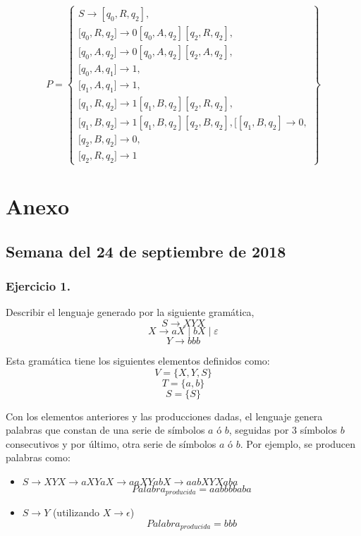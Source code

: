 \documentclass[11pt,a4paper]{article}
\begin{document}
	  \[P=\left\{\begin{array}{c} 
	  			 S\rightarrow [q_0,R,q_2],\\
	  			 \lbrack q_0,R,q_2]\rightarrow 0[q_0,A,q_2][q_2,R,q_2],\\
	  			 \lbrack q_0,A,q_2]\rightarrow 0[q_0,A,q_2][q_2,A,q_2],\\
	  			 \lbrack q_0,A,q_1]\rightarrow 1, \\
	  			 \lbrack q_1,A,q_1]\rightarrow 1,\\
	  			 \lbrack q_1,R,q_2]\rightarrow 1[q_1,B,q_2][q_2,R,q_2],\\
	  			 \lbrack q_1,B,q_2]\rightarrow 1[q_1,B,q_2][q_2,B,q_2],
	  			 \lbrack [q_1,B,q_2]\rightarrow 0, \\
	  			 \lbrack q_2,B,q_2]\rightarrow 0,\\
	  			 \lbrack q_2,R,q_2]\rightarrow 1
	\end{array}\right\}\]

\newpage

\section{Anexo}
\subsection{Semana del 24 de septiembre de 2018}

\subsubsection{Ejercicio 1.} Describir el lenguaje generado por la siguiente gramática,\\
	\[S\rightarrow XYX \]
	\[X\rightarrow aX \mid bX \mid \varepsilon\]
	\[Y\rightarrow bbb\]
	
Esta gramática tiene los siguientes elementos definidos como:
	\[V=\{X,Y,S\}\]
	\[T=\{a,b\}\]
	\[S=\{S\}\]
	
Con los elementos anteriores y las producciones dadas, el lenguaje genera palabras que constan de una serie de símbolos $a$ ó $b$, seguidas por 3 símbolos $b$ consecutivos y por último, otra serie de símbolos $a$ ó $b$. Por ejemplo, se producen palabras como:

	\begin{itemize}
	\item $S\rightarrow XYX\rightarrow aXYaX\rightarrow aaXYabX \rightarrow aabXYXaba$
	\[Palabra_{producida}=aabbbbaba\]
	\item $S\rightarrow Y$ (utilizando $X\rightarrow \epsilon$)
	\[Palabra_{producida}=bbb\]
	\end{itemize}
	
\end{document}
